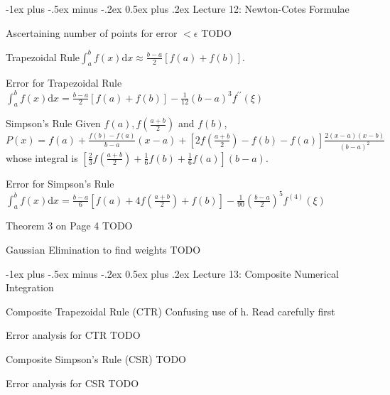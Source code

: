 \documentclass[10pt,landscape]{article}
\makeatletter
\renewcommand{\section}{\@startsection{section}{1}{0mm}%
                                {-1ex plus -.5ex minus -.2ex}%
                                {0.5ex plus .2ex}%
                                {\normalfont\large\bfseries}}
\theoremstyle{definition}
\newcommand{\thistheoremname}{}
\newtheorem*{genericthm*}{\thistheoremname}
\newenvironment{namedthm*}[1]
{\renewcommand{\thistheoremname}{#1}\begin{genericthm*}}
{\end{genericthm*}}
\makeatother
\begin{document}
\begin{multicols}{3}
	\section{Lecture 12: Newton-Cotes Formulae}
	\begin{namedthm*}{Ascertaining number of points for error \(< \epsilon\)}
		\color{red} TODO
	\end{namedthm*}
	\begin{namedthm*}{Trapezoidal Rule}\(\int_{a}^{b} f(x) \mathrm{d} x \approx \frac{b-a}{2}[f(a)+f(b)]\).
	\end{namedthm*}
	\begin{namedthm*}{Error for Trapezoidal Rule}\(\int_{a}^{b} f(x) \mathrm{d} x=\frac{b-a}{2}[f(a)+f(b)]-\frac{1}{12}(b-a)^{3} f^{\prime \prime}(\xi)\)
	\end{namedthm*}
	\begin{namedthm*}{Simpson's Rule} Given \(f(a), f\left(\frac{a+b}{2}\right)\) and \(f(b)\), \(P(x)=f(a)+\frac{f(b)-f(a)}{b-a}(x-a)+\left[2 f\left(\frac{a+b}{2}\right)-f(b)-f(a)\right] \frac{2(x-a)(x-b)}{(b-a)^{2}}\) whose integral is \(\left[\frac{2}{3} f\left(\frac{a+b}{2}\right)+\frac{1}{6} f(b)+\frac{1}{6} f(a)\right](b-a)\).
	\end{namedthm*}
	\begin{namedthm*}{Error for Simpson's Rule}\(\int_{a}^{b} f(x) \mathrm{d} x=\frac{b-a}{6}\left[f(a)+4 f\left(\frac{a+b}{2}\right)+f(b)\right]-\frac{1}{90}\left(\frac{b-a}{2}\right)^{5} f^{(4)}(\xi)\)
	\end{namedthm*}
	\begin{namedthm*}{Theorem 3 on Page 4}
		\color{red}TODO
	\end{namedthm*}
	\begin{namedthm*}{Gaussian Elimination to find weights}
		\color{red}TODO
	\end{namedthm*}
	\section{Lecture 13: Composite Numerical Integration}
	\begin{namedthm*}{Composite Trapezoidal Rule (CTR)}
		\color{red} Confusing use of h. Read carefully first
	\end{namedthm*}
	\begin{namedthm*}{Error analysis for CTR}
		\color{red} TODO
	\end{namedthm*}
	\begin{namedthm*}{Composite Simpson's Rule (CSR)}
		\color{red} TODO
	\end{namedthm*}
	\begin{namedthm*}{Error analysis for CSR}
		\color{red} TODO
	\end{namedthm*}

\end{multicols}
\end{document}
